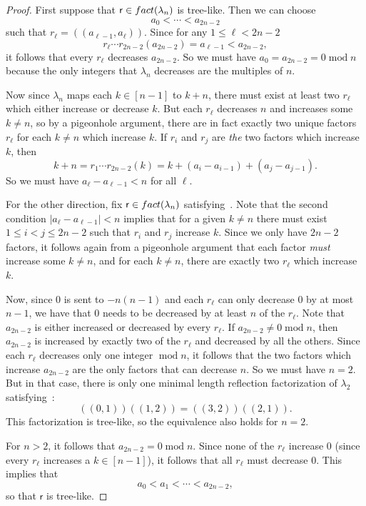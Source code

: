 \documentclass[a4paper,10pt,leqno]{amsart}
\numberwithin{equation}{section}
\theoremstyle{definition}
\theoremstyle{remark}
\newcommand{\Fact}{\textsc{fact}}
\renewcommand{\mod}{\;\mathrm{mod}\;}
\newcommand{\rr}{\mathsf{r}}
\newcommand{\rrr}{r}
\newcounter{intege}
\begin{document}
\begin{proof}
    First suppose that $\rr \in \Fact(\lambda_n)$ is tree-like.  Then we can choose
    \[
        a_0 < \cdots < a_{2n-2}
    \]
    such that $\rrr_\ell = (\!(a_{\ell -1}, a_\ell)\!)$.  Since for any $1 \leq \ell < 2n-2$
    \[
        \rrr_\ell \cdots \rrr_{2n-2}(a_{2n-2}) = a_{\ell-1} < a_{2n-2},
    \]
    it follows that every $\rrr_\ell$ decreases $a_{2n-2}$. So we must have $a_0 = a_{2n-2} = 0 \mod n$ because the only integers that $\lambda_n$ decreases are the multiples of $n$.

    Now since $\lambda_n$ maps each $k \in [n-1]$ to $k+n$, there must exist at least two $\rrr_\ell$ which either increase or decrease $k$. But each $\rrr_\ell$ decreases $n$ and increases some $k\neq n$, so by a pigeonhole argument, there are in fact exactly two unique factors $\rrr_\ell$ for each $k\neq n$ which increase $k$. If $\rrr_i$ and $\rrr_j$ are \emph{the} two factors which increase $k$, then
    \[
        k+n = \rrr_1\cdots \rrr_{2n-2}(k) = k + (a_i - a_{i-1}) + (a_j - a_{j-1}).
    \]
    So we must have $a_\ell - a_{\ell-1} < n$ for all $\ell$.
\medskip

     For the other direction, fix $\rr \in \Fact(\lambda_n)$ satisfying~.
          Note that the second condition $|a_\ell - a_{\ell-1}| < n$ implies that for a given $k \neq n$ there must exist $1 \leq i < j \leq 2n-2$ such that $\rrr_i$ and $\rrr_j$ increase $k$. Since we only have $2n-2$ factors, it follows again from a pigeonhole argument that each factor \emph{must} increase some $k \neq n$, and for each $k \neq n$, there are exactly two $\rrr_\ell$ which increase $k$.

    Now, since $0$ is sent to $-n(n-1)$ and each $\rrr_\ell$ can only decrease $0$ by at most $n-1$, we have that $0$ needs to be decreased by at least $n$ of the $\rrr_\ell$. Note that $a_{2n-2}$ is either increased or decreased by every $\rrr_\ell$. If $a_{2n-2} \neq 0 \mod n$, then $a_{2n-2}$ is increased by exactly two of the $\rrr_\ell$ and decreased by all the others. Since each $\rrr_\ell$ decreases only one integer $\mod n$, it follows that the two factors which increase $a_{2n-2}$ are the only factors that can decrease $n$. So we must have $n=2$. But in that case, there is only one minimal length reflection factorization of $\lambda_2$ satisfying~: \[(\!(0,1)\!)(\!(1,2)\!) = (\!(3,2)\!)(\!(2,1)\!).\] This factorization is tree-like, so the equivalence also holds for $n=2$.

    For $n > 2$, it follows that $a_{2n-2} = 0 \mod n$.  Since none of the $\rrr_\ell$ increase $0$ (since every $\rrr_\ell$ increases a $k \in [n-1]$), it follows that all $\rrr_\ell$ must decrease $0$. This implies that
    \[
        a_0 < a_1 < \cdots < a_{2n-2},
    \] 
    so that $\rr$ is tree-like.
\end{proof}
\end{document}
